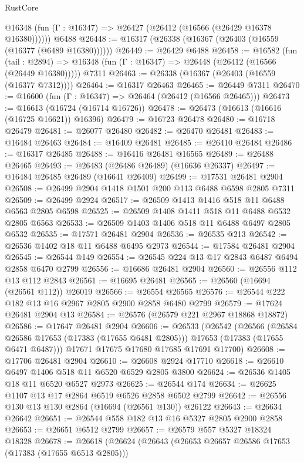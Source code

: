\begin{lexlean}{RustCore}
\begin{coremodule}
      @16348 (fun (Γ : @16347) => @26427 (@26412 (@16566 (@26429 @16378 @16380))))))
    @6488
@26448 := @16317 (@26338 (@16367 (@26403 (@16559 (@16377 (@6489 @16380))))))
@26449 := @26429 @6488
@26458 := @16582
    (fun (tail : @2894) => @16348 (fun (Γ : @16347) => @26448 (@26412 (@16566 (@26449 @16380)))))
    @7311
@26463 := @26338 (@16367 (@26403 (@16559 (@16377 @7312))))
@26464 := @16317 @26463
@26465 := @26449 @7311
@26470 := @16600 (fun (Γ : @16347) => @26464 (@26412 (@16566 @26465)))
@26473 := @16613 (@16724 (@16714 @16726))
@26478 := @26473 (@16613 (@16616 (@16725 @16621)) @16396)
@26479 := @16723 @26478
@26480 := @16718 @26479
@26481 := @26077 @26480
@26482 := @26470 @26481
@26483 := @16484 @26463
@26484 := @16409 @26481
@26485 := @26410 @26484
@26486 := @16317 @26485
@26488 := @16416 @26481 @16565
@26489 := @26488 @26465
@26493 := @26483 (@26486 @26489) (@16636 @26337)
@26497 := @16484 @26485 @26489 (@16641 @26409)
@26499 := @17531 @26481 @2904
@26508 := @26499 @2904 @1418 @1501 @200 @113 @6488 @6598 @2805 @7311
@26509 := @26499 @2924
@26517 := @26509 @1413 @1416 @518 @11 @6488 @6563 @2805 @6598
@26525 := @26509 @1408 @1411 @518 @11 @6488 @6532 @2805 @6563
@26533 := @26509 @1403 @1406 @518 @11 @6488 @6497 @2805 @6532
@26535 := @17571 @26481 @2904
@26536 := @26535 @213
@26542 := @26536 @1402 @18 @11 @6488 @6495 @2973
@26544 := @17584 @26481 @2904
@26545 := @26544 @149
@26554 := @26545 @224 @13 @17 @2843 @6487 @6494 @2858 @6470 @2799
@26556 := @16686 @26481 @2904
@26560 := @26556 @112 @13 @112 @2843
@26561 := @16695 @26481
@26565 := @26560 (@16694 (@26561 @112)) @26019
@26566 := @26554 @26565
@26576 := @26544 @222 @182 @13 @16 @2967 @2805 @2900 @2858 @6480 @2799
@26579 := @17624 @26481 @2904 @13
@26584 := @26576 (@26579 @221 @2967 @18868 @18872)
@26586 := @17647 @26481 @2904
@26606 := @26533
    (@26542
      (@26566
        (@26584 @26586 @17653 (@17383 (@17655 @6481 @2805)))
        @17653
        (@17383 (@17655 @6471 @6487)))
      @17671
      @17675
      @17680
      @17685
      @17691
      @17700)
@26608 := @17706 @26481 @2904
@26610 := @26608 @2924 @17710
@26618 := @26610 @6497 @1406 @518 @11 @6520 @6529 @2805 @3800
@26624 := @26536 @1405 @18 @11 @6520 @6527 @2973
@26625 := @26544 @174
@26634 := @26625 @1107 @13 @17 @2864 @6519 @6526 @2858 @6502 @2799
@26642 := @26556 @130 @13 @130 @2864 (@16694 (@26561 @130)) @26122
@26643 := @26634 @26642
@26651 := @26544 @558 @182 @13 @16 @5327 @2805 @2900 @2858
@26653 := @26651 @6512 @2799
@26657 := @26579 @557 @5327 @18324 @18328
@26678 := @26618
    (@26624
      (@26643
        (@26653 @26657 @26586 @17653 (@17383 (@17655 @6513 @2805)))

\end{coremodule}
\end{lexlean}
